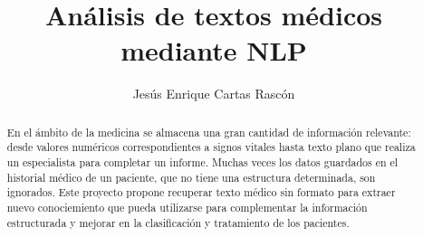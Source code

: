\documentclass[12pt, a4paper, twoside]{report}
\title{Análisis de textos médicos \\mediante NLP}
\author{Jesús Enrique Cartas Rascón}
\begin{document}


\begin{abstract}
  En el ámbito de la medicina se almacena una gran cantidad de información relevante: desde valores numéricos correspondientes a signos vitales hasta texto plano que realiza un especialista para completar un informe. Muchas veces los datos guardados en el historial médico de un paciente, que no tiene una estructura determinada, son ignorados. Este proyecto propone recuperar texto médico sin formato para extraer nuevo conociemiento que pueda utilizarse para complementar la información estructurada y mejorar en la clasificación y tratamiento de los pacientes.
\end{abstract}


\tableofcontents






















\end{document}
